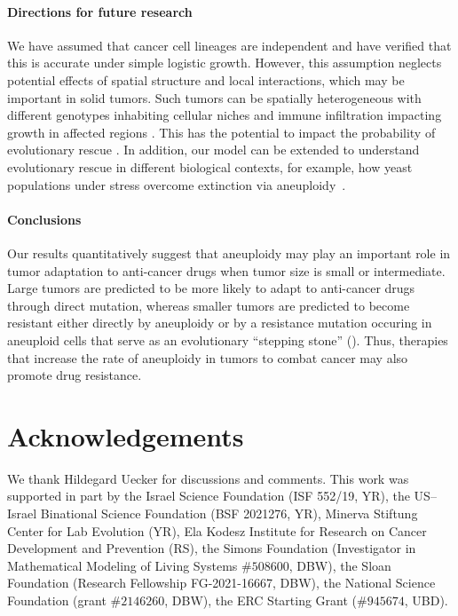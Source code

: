 \documentclass[12pt]{extarticle}
\begin{document}
\paragraph{Directions for future research}
We have assumed that cancer cell lineages are independent and have verified that this is accurate under simple logistic growth. However, this assumption neglects potential effects of spatial structure and local interactions, which may be important in solid tumors. Such tumors can be spatially heterogeneous with different genotypes inhabiting cellular niches and immune infiltration impacting growth in affected regions \citep{varrone2023cellcharter,galon2010immune}. This has the potential to impact the probability of evolutionary rescue \citep{martens2011spatial}.
In addition, our model can be extended to understand evolutionary rescue in different biological contexts, for example, how yeast populations under stress overcome extinction via aneuploidy~\citep{pompei2023fitness,kohanovski2024aneuploidy}. 


\paragraph{Conclusions}

Our results quantitatively suggest that aneuploidy may play an important role in tumor adaptation to anti-cancer drugs when tumor size is small or intermediate. Large tumors are predicted to be more likely to adapt to anti-cancer drugs through direct mutation, whereas smaller tumors are predicted to become resistant either directly by aneuploidy or by a resistance mutation occuring in aneuploid cells that serve as an evolutionary ``stepping stone'' (). Thus, therapies that increase the rate of aneuploidy in tumors to combat cancer may also promote drug resistance.

{\small
\section*{Acknowledgements}
We thank Hildegard Uecker for discussions and comments. 
This work was supported in part by
the Israel Science Foundation (ISF 552/19, YR),
the US–Israel Binational Science Foundation (BSF 2021276, YR), 
Minerva Stiftung Center for Lab Evolution (YR), 
Ela Kodesz Institute for Research on Cancer Development and Prevention (RS),
the Simons Foundation (Investigator in Mathematical Modeling of Living Systems $\#508600$, DBW),
the Sloan Foundation (Research Fellowship FG-2021-16667, DBW),
the National Science Foundation (grant $\#2146260$, DBW), the ERC Starting Grant ($\#945674$, UBD).
}
\end{document}
